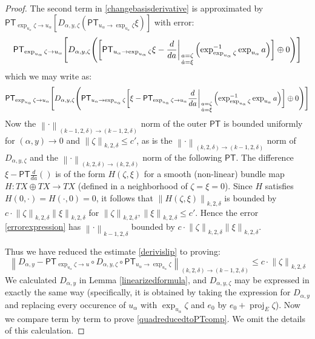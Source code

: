 \documentclass[12pt]{article}
\theoremstyle{definition}
\theoremstyle{remark}
\numberwithin{equation}{subsection}
\newcommand{\PT}{\mathsf{PT}}
\newcommand{\proj}{\operatorname{proj}}
\begin{document}
\begin{proof}
The second term in \eqref{changebasisderivative} is approximated by $\PT_{\exp_{u_\alpha}\zeta\to u_\alpha}\left[D_{\alpha,y,\zeta}\left(\PT_{u_\alpha\to\exp_{u_\alpha}\zeta}\xi\right)\right]$ with error:
\begin{equation}\label{errorexpression}
\PT_{\exp_{u_\alpha}\zeta\to u_\alpha}\Biggl[D_{\alpha,y,\zeta}\Biggl(\biggl[\PT_{u_\alpha\to\exp_{u_\alpha}\zeta}\xi-\frac d{da}\biggr|_{\begin{smallmatrix}a=\zeta\cr\dot a=\xi\end{smallmatrix}}\Bigl(\exp_{\exp_{u_\alpha}\zeta}^{-1}\exp_{u_\alpha}a\Bigr)\biggr]\oplus 0\Biggr)\Biggr]
\end{equation}
which we may write as:
\begin{equation}
\PT_{\exp_{u_\alpha}\zeta\to u_\alpha}\Biggl[D_{\alpha,y,\zeta}\Biggl(\PT_{u_\alpha\to\exp_{u_\alpha}\zeta}\biggl[\xi-\PT_{\exp_{u_\alpha}\zeta\to u_\alpha}\frac d{da}\biggr|_{\begin{smallmatrix}a=\zeta\cr\dot a=\xi\end{smallmatrix}}\Bigl(\exp_{\exp_{u_\alpha}\zeta}^{-1}\exp_{u_\alpha}a\Bigr)\biggr]\oplus 0\Biggr)\Biggr]
\end{equation}
Now the $\left\|\cdot\right\|_{(k-1,2,\delta)\to(k-1,2,\delta)}$ norm of the outer $\PT$ is bounded uniformly for $(\alpha,y)\to 0$ and $\left\|\zeta\right\|_{k,2,\delta}\leq c'$, as is the $\left\|\cdot\right\|_{(k,2,\delta)\to(k-1,2,\delta)}$ norm of $D_{\alpha,y,\zeta}$ and the $\left\|\cdot\right\|_{(k,2,\delta)\to(k,2,\delta)}$ norm of the following $\PT$.  The difference $\xi-\PT\frac d{da}()$ is of the form $H(\zeta,\xi)$ for a smooth (non-linear) bundle map $H:TX\oplus TX\to TX$ (defined in a neighborhood of $\zeta=\xi=0$).  Since $H$ satisfies $H(0,\cdot)=H(\cdot,0)=0$, it follows that $\left\|H(\zeta,\xi)\right\|_{k,2,\delta}$ is bounded by $c\cdot\left\|\zeta\right\|_{k,2,\delta}\left\|\xi\right\|_{k,2,\delta}$ for $\left\|\zeta\right\|_{k,2,\delta},\left\|\xi\right\|_{k,2,\delta}\leq c'$.  Hence the error \eqref{errorexpression} has $\left\|\cdot\right\|_{k-1,2,\delta}$ bounded by $c\cdot\left\|\zeta\right\|_{k,2,\delta}\left\|\xi\right\|_{k,2,\delta}$.

Thus we have reduced the estimate \eqref{derivislip} to proving:
\begin{equation}\label{quadreducedtoPTcomp}
\left\|D_{\alpha,y}-\PT_{\exp_{u_\alpha}\zeta\to u}\circ D_{\alpha,y,\zeta}\circ\PT_{u_\alpha\to\exp_{u_\alpha}\zeta}\right\|_{(k,2,\delta)\to(k-1,2,\delta)}\leq c\cdot\left\|\zeta\right\|_{k,2,\delta}
\end{equation}
We calculated $D_{\alpha,y}$ in Lemma \ref{linearizedformula}, and $D_{\alpha,y,\zeta}$ may be expressed in exactly the same way (specifically, it is obtained by taking the expression for $D_{\alpha,y}$ and replacing every occurence of $u_\alpha$ with $\exp_{u_\alpha}\zeta$ and $e_0$ by $e_0+\proj_E\zeta$).  Now we compare term by term to prove \eqref{quadreducedtoPTcomp}.  We omit the details of this calculation.
\end{proof}
\end{document}
